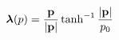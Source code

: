 \begin{equation}
\mbox{\boldmath $\lambda$}(p) = \frac{{\bf p}}{|{\bf p}|} \tanh^{-1} 
\frac{|{\bf p}|}{p_{0}} 
\end{equation}

